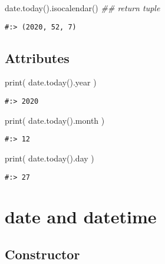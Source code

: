 \documentclass[
]{book}
\newenvironment{Shaded}{\begin{snugshade}}{\end{snugshade}}
\newcommand{\BuiltInTok}[1]{#1}
\newcommand{\CommentTok}[1]{\textcolor[rgb]{0.37,0.37,0.37}{\textit{#1}}}
\newcommand{\NormalTok}[1]{#1}
\begin{document}
\begin{Shaded}
\begin{Highlighting}[]
\NormalTok{date.today().isocalendar() }\CommentTok{\#\# return tuple }
\end{Highlighting}
\end{Shaded}

\begin{verbatim}
#:> (2020, 52, 7)
\end{verbatim}

\hypertarget{attributes}{%
\subsection{Attributes}\label{attributes}}

\begin{Shaded}
\begin{Highlighting}[]
\BuiltInTok{print}\NormalTok{( date.today().year )}
\end{Highlighting}
\end{Shaded}

\begin{verbatim}
#:> 2020
\end{verbatim}

\begin{Shaded}
\begin{Highlighting}[]
\BuiltInTok{print}\NormalTok{( date.today().month )}
\end{Highlighting}
\end{Shaded}

\begin{verbatim}
#:> 12
\end{verbatim}

\begin{Shaded}
\begin{Highlighting}[]
\BuiltInTok{print}\NormalTok{( date.today().day )}
\end{Highlighting}
\end{Shaded}

\begin{verbatim}
#:> 27
\end{verbatim}

\hypertarget{date-and-datetime}{%
\section{date and datetime}\label{date-and-datetime}}

\hypertarget{constructor-4}{%
\subsection{Constructor}\label{constructor-4}}
\end{document}
